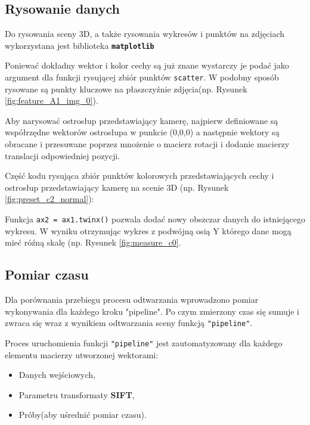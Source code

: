 \subsection{Rysowanie danych}

Do rysowania sceny 3D, a także rysowania wykresów i punktów na zdjęciach wykorzystana jest biblioteka \textbf{\texttt{matplotlib}}

Poniewać dokładny wektor i kolor cechy są już znane wystarczy je podać jako argument dla funkcji rysującej zbiór punktów \texttt{scatter}.
W podobny sposób rysowane są punkty kluczowe na płaszczyźnie zdjęcia(np. Rysunek \ref{fig:feature_A1_img_0}).

Aby narysować ostrosłup przedstawiający kamerę, najpierw definiowane są współrzędne wektorów ostrosłupa w punkcie (0,0,0) a następnie wektory są obracane i przesuwane poprzez mnożenie o macierz rotacji i dodanie macierzy translacji odpowiedniej pozycji.

Część kodu rysująca zbiór punktów kolorowych przedstawiających cechy i  ostrosłup przedstawiający kamerę na scenie 3D (np. Rysunek \ref{fig:preset_c2_normal}):


Funkcja \texttt{ax2 = ax1.twinx()} pozwala dodać nowy obszczar danych do istniejącego wykresu. W wyniku otrzymując wykres z podwójną osią Y którego dane mogą mieć róźną skalę (np. Rysunek \ref{fig:measure_c0}.

\subsection{Pomiar czasu}

Dla porównania przebiegu procesu odtwarzania wprowadzono pomiar wykonywania dla każdego kroku "pipeline". Po czym zmierzony czas się sumuje i zwraca się wraz z wynikiem odtwarzania sceny funkcją \texttt{"pipeline"}.

Proces uruchomienia funkcji \texttt{"pipeline"} jest zautomatyzowany dla każdego elementu macierzy utworzonej wektorami:
\begin{itemize}
   \item Danych wejściowych,
   \item Parametru transformaty \textbf{SIFT},
   \item Próby(aby uśrednić pomiar czasu).
\end{itemize}
